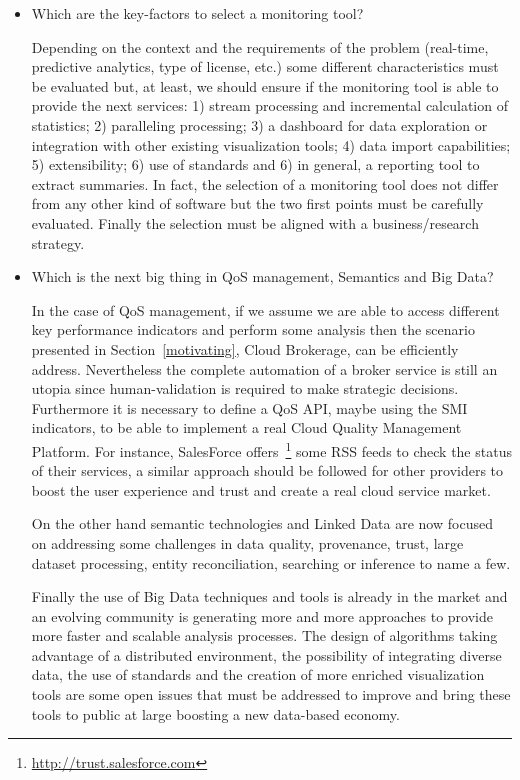 \begin{itemize}
\item Which are the key-factors to select a monitoring tool?


Depending on the context and the requirements of the problem (real-time, predictive analytics, type of license, etc.) 
some different characteristics must be evaluated but, at least, we should ensure if the monitoring tool 
is able to provide the next services: 1) stream processing and incremental calculation of statistics; 
2) paralleling processing; 3) a dashboard for data exploration or integration with other 
existing visualization tools; 4) data import capabilities; 5) extensibility; 6) use of standards and 6) in general, 
a reporting tool to extract summaries. In fact, the selection of a monitoring tool does not differ from 
any other kind of software but the two first points must be carefully evaluated. Finally the selection 
must be aligned with a business/research strategy.


\item Which is the next big thing in QoS management, Semantics and Big Data?

In the case of QoS management, if we assume we are able to access different key performance indicators and perform 
some analysis then the scenario presented in Section~\ref{motivating}, Cloud Brokerage, can 
be efficiently address. Nevertheless the complete automation of a broker service is still 
an utopia since human-validation is required to make strategic decisions. Furthermore it is necessary 
to define a QoS API, maybe using the SMI indicators, to be able to implement a real Cloud Quality Management 
Platform. For instance, SalesForce offers~\footnote{\url{http://trust.salesforce.com}} 
some RSS feeds to check the status of their services, a similar approach should be followed for other providers to boost 
the user experience and trust and create a real cloud service market.

On the other hand semantic technologies and Linked Data are now focused on addressing some challenges in
data quality, provenance, trust, large dataset processing, entity reconciliation, searching 
or inference to name a few.

Finally the use of Big Data techniques and tools is already in the market and an evolving community is generating 
more and more approaches to provide more faster and scalable analysis processes. The design of algorithms taking 
advantage of a distributed environment, the possibility of integrating diverse data, the use of standards and the creation 
of more enriched visualization tools are some open issues that must be addressed to improve and bring these tools 
to public at large boosting a new data-based economy.

\end{itemize}







